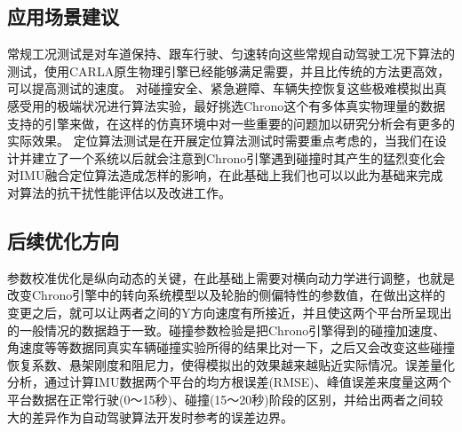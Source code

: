 \subsection{应用场景建议}
常规工况测试是对车道保持、跟车行驶、匀速转向这些常规自动驾驶工况下算法的测试，使用CARLA原生物理引擎已经能够满足需要，并且比传统的方法更高效，可以提高测试的速度。
对碰撞安全、紧急避障、车辆失控恢复这些极难模拟出真感受用的极端状况进行算法实验，最好挑选Chrono这个有多体真实物理量的数据支持的引擎来做，在这样的仿真环境中对一些重要的问题加以研究分析会有更多的实际效果。
定位算法测试是在开展定位算法测试时需要重点考虑的，当我们在设计并建立了一个系统以后就会注意到Chrono引擎遇到碰撞时其产生的猛烈变化会对IMU融合定位算法造成怎样的影响，在此基础上我们也可以以此为基础来完成对算法的抗干扰性能评估以及改进工作。
\subsection{后续优化方向}
参数校准优化是纵向动态的关键，在此基础上需要对横向动力学进行调整，也就是改变Chrono引擎中的转向系统模型以及轮胎的侧偏特性的参数值，在做出这样的变更之后，就可以让两者之间的Y方向速度有所接近，并且使这两个平台所呈现出的一般情况的数据趋于一致。碰撞参数检验是把Chrono引擎得到的碰撞加速度、角速度等等数据同真实车辆碰撞实验所得的结果比对一下，之后又会改变这些碰撞恢复系数、悬架刚度和阻尼力，使得模拟出的效果越来越贴近实际情况。误差量化分析，通过计算IMU数据两个平台的均方根误差(RMSE)、峰值误差来度量这两个平台数据在正常行驶(0～15秒)、碰撞(15～20秒)阶段的区别，并给出两者之间较大的差异作为自动驾驶算法开发时参考的误差边界。
\newpage



